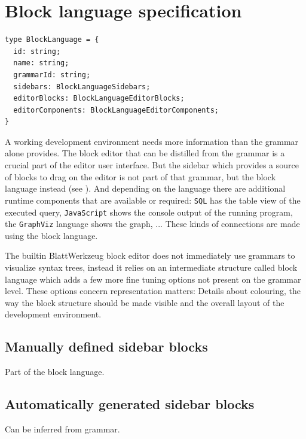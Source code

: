 \documentclass[]{report}
\begin{document}
\section{Block language specification}
\label{sec:block-language-specification}

\begin{listing}[H]
\begin{verbatim}
type BlockLanguage = {
  id: string;
  name: string;
  grammarId: string;
  sidebars: BlockLanguageSidebars;
  editorBlocks: BlockLanguageEditorBlocks;
  editorComponents: BlockLanguageEditorComponents;
}
\end{verbatim}
\caption{Type definition of a block language}
\label{lst:block-language-definition}
\end{listing}

A working development environment needs more information than the grammar alone provides. The block editor that can be distilled from the grammar is a crucial part of the editor user interface. But the sidebar which provides a source of blocks to drag on the editor is not part of that grammar, but the block language instead (see ). And depending on the language there are additional runtime components that are available or required: \texttt{SQL} has the table view of the executed query, \texttt{JavaScript} shows the console output of the running program, the \texttt{GraphViz} language shows the graph, ... These kinds of connections are made using the block language.

The builtin Blatt\-Werkzeug block editor does not immediately use grammars to visualize syntax trees, instead it relies on an intermediate structure called block language which adds a few more fine tuning options not present on the grammar level. These options concern representation matters: Details about colouring, the way the block structure should be made visible and the overall layout of the development environment.

\subsection{Manually defined sidebar blocks}

Part of the block language.

\subsection{Automatically generated sidebar blocks}

Can be inferred from grammar.
\end{document}
